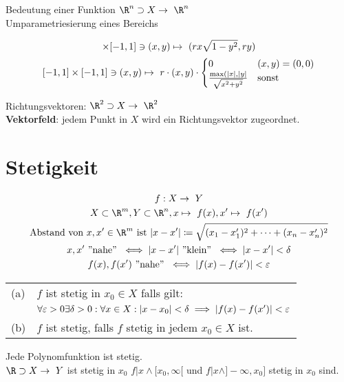 Bedeutung einer Funktion $\R^n \supset X \rightarrow \R^n$\\
Umparametriesierung eines Bereichs\\
\begin{bsp*}[note = {Kreisscheibe $\subset \R^2 , x^2 + y^2 \leq r^2$}]
	\begin{gather*}
		[-1,1] \times [-1,1] \ni (x,y) \mapsto ( r x \sqrt{1-y^2} , r y )\\
		[-1,1] \times [-1,1] \ni (x,y) \mapsto r \cdot (x,y) \cdot \begin{cases}
			0									&(x,y) = (0,0)	\\
			\frac{\max( \abs{x} , \abs{y}}{\sqrt{x^2 + y^2}}	&\text{sonst}			
		\end{cases}
	\end{gather*}
\end{bsp*}
\begin{bsp*}[note = linearer Koordinatenwechsel]
\end{bsp*}

Richtungsvektoren:
$\R^2 \supset X \rightarrow \R^2$\\
\textbf{Vektorfeld}: jedem Punkt in $X$ wird ein Richtungsvektor zugeordnet.\\
\begin{bsp*}[note = Geschwindigkeitsvektoe einer fliessender Flüssigkeit $\rightarrow$ Differentialgleichung]
\end{bsp*}

\section{Stetigkeit}
\begin{gather*}
	f: X \rightarrow Y \\
	X \subset \R^m , Y \subset \R^n , x \mapsto f(x) , x' \mapsto f(x')\\
	\text{Abstand von } x, x' \in \R ^m \text{ ist } \abs{x-x'} \coloneqq \sqrt{(x_1 - x'_1)^2 + \dots + (x_n - x'_n)^2} \\
	x, x' \text{ ''nahe'' } \iff \abs{x-x'} \text{ ''klein'' } \iff \abs{x-x'} < \delta \\
	f(x), f(x') \text{ ''nahe'' } \iff \abs{f(x) - f(x')} < \epsilon
\end{gather*}
\begin{def*}[note = Stetigkeit , index = Stetigkeit]
	\begin{tabular}{ll}
		(a)	&$f$ ist stetig in $x_0 \in X$ falls gilt:															\\
			&$\forall \epsilon > 0 \exists \delta > 0 : \forall x \in X : \abs{x-x_0} < \delta \implies \abs{f(x) - f(x')} < \epsilon$	\\
		(b)	&$f$ ist stetig, falls $f$ stetig in jedem $x_0 \in X$ ist.
	\end{tabular}
\end{def*}
\begin{fakt}
	Jede Polynomfunktion ist stetig. \\
	$\R \supset X \rightarrow Y$ ist stetig in $x_0$ \gdw $f|x \wedge [x_0,\infty[$ und $f|x \wedge ]-\infty,x_0]$ stetig in $x_0$ sind.
\end{fakt}

